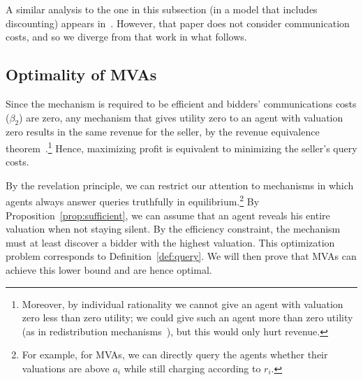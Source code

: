A similar analysis to the one in this subsection (in a model that
includes discounting) appears in~\cite{McAfee97:SequentialAuctions}.  
However, that paper does not consider communication costs, and so we
diverge from that work in what follows.

\subsection{Optimality of MVAs}


Since the mechanism is required to be efficient and bidders' communications
costs ($\beta_2$) are zero, any mechanism that gives utility zero to an
agent with valuation zero results in the same revenue for the seller, by
the revenue equivalence theorem~\cite{Myerson:1981}.\footnote{Moreover, by
  individual rationality we cannot give an agent with valuation zero less
  than zero utility; we could give such an agent more than zero utility (as
  in redistribution mechanisms~\cite{}), but this would only hurt revenue.}
Hence, maximizing profit is equivalent to minimizing the seller's query
costs.

By the revelation principle, we can restrict our attention to mechanisms in
which agents always answer queries truthfully in equilibrium.\footnote{For
  example, for MVAs, we can directly query the agents whether their
  valuations are above $a_i$ while still charging according to 
  $r_i$.}  By Proposition~\ref{prop:sufficient}, we can assume that an
agent reveals his entire valuation when not staying silent.  By the
efficiency constraint, the mechanism must at least discover a bidder with
the highest valuation.  This optimization problem corresponds to
Definition~\ref{def:query}.  We will then prove that MVAs can achieve this
lower bound and are hence optimal.


